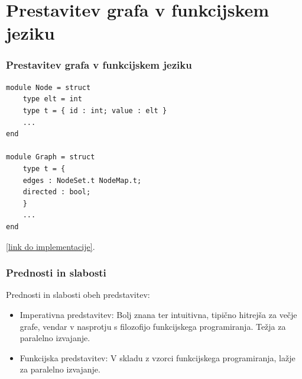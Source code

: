 \documentclass{beamer}
\begin{document}
\section{Prestavitev grafa v funkcijskem jeziku}

\begin{frame}[fragile]
    \frametitle{Prestavitev grafa v funkcijskem jeziku}
\begin{verbatim}
module Node = struct
    type elt = int
    type t = { id : int; value : elt }
    ...
end

module Graph = struct
    type t = {
    edges : NodeSet.t NodeMap.t;
    directed : bool;
    }
    ...
end
    \end{verbatim}
        
    \href{https://github.com/tjazerzen/parallelisation-of-graph-algorithms-in-functional-programming-languages/blob/master/playground/graph/graph.ml}{[link do implementacije]}.
\end{frame}

\begin{frame}
    \frametitle{Prednosti in slabosti}
    Prednosti in slabosti obeh predstavitev:
    \begin{itemize}
    \item Imperativna predstavitev: Bolj znana ter intuitivna, tipično hitrejša za večje grafe, vendar v nasprotju s filozofijo funkcijskega programiranja.
          Težja za paralelno izvajanje.
    \item Funkcijska predstavitev: V skladu z vzorci funkcijskega programiranja, lažje za paralelno izvajanje.
    \end{itemize}
\end{frame}
\end{document}

